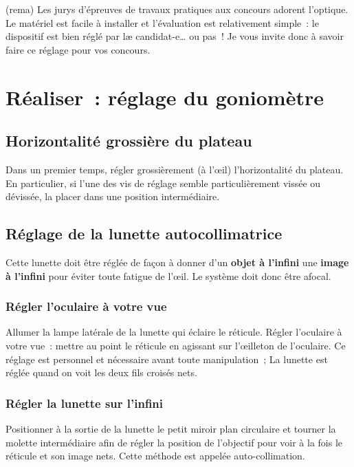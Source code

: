 \documentclass[../main/main.tex]{subfiles}
\begin{document}
{\begin{tcb}(rema){}
  Les jurys d'épreuves de travaux pratiques aux concours adorent l'optique. Le
  matériel est facile à installer et l'évaluation est relativement simple~: le
  dispositif est bien réglé par læ candidat-e… ou pas~! Je vous invite donc à
  savoir faire ce réglage pour vos concours.
\end{tcb}

\section{Réaliser~: réglage du goniomètre}

\subsection{Horizontalité grossière du plateau}

Dans un premier temps, régler grossièrement (à l'œil) l'horizontalité du
plateau. En particulier, si l'une des vis de réglage semble particulièrement
vissée ou dévissée, la placer dans une position intermédiaire. 

\subsection{Réglage de la lunette autocollimatrice}

Cette lunette doit être réglée de façon à donner d'un \textbf{objet à l'infini}
une \textbf{image à l'infini} pour éviter toute fatigue de l'œil. Le système
doit donc être afocal.

\subsubsection{Régler l'oculaire à votre vue}

Allumer la lampe latérale de la lunette qui éclaire le réticule.
Régler l'oculaire à votre vue~: mettre au point le réticule en agissant sur
l'œilleton de l'oculaire. Ce réglage est personnel et nécessaire avant toute
manipulation~; La lunette est réglée quand on voit les deux fils croisés nets.


\subsubsection{Régler la lunette sur l'infini}

Positionner à la sortie de la lunette le petit miroir plan circulaire et tourner
la molette intermédiaire afin de régler la position de l'objectif  pour voir à
la fois le réticule et son image nets. Cette méthode est appelée
auto-collimation. 


}
\end{document}
